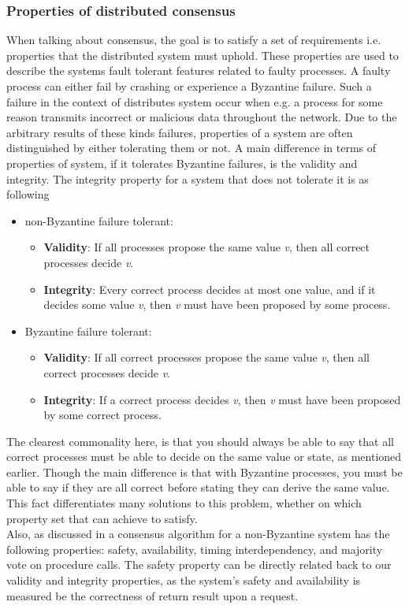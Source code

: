 \subsubsection{Properties of distributed consensus}
When talking about consensus, the goal is to satisfy a set of requirements i.e. properties that the distributed system must uphold. These properties are used to describe the systems fault tolerant features related to faulty processes. A faulty process can either fail by crashing or experience a Byzantine failure. Such a failure in the context of distributes system occur when e.g. a process for some reason transmits incorrect or malicious data throughout the network. Due to the arbitrary results of these kinds failures, properties of a system are often distinguished by either tolerating them or not. A main difference in terms of properties of system, if it tolerates Byzantine failures, is the validity and integrity. The integrity property for a system that does not tolerate it is as following\cite{Distributed Systems}
\begin{itemize}
\item non-Byzantine failure tolerant:
	\begin{itemize}
	\item \textbf{Validity}: If all processes propose the same value \textit{v}, then all correct processes decide \textit{v}.
	\item \textbf{Integrity}: Every correct process decides at most one value, and if it decides some value \textit{v}, then \textit{v} must have been proposed by some process.
	\end{itemize}
\item Byzantine failure tolerant:
	\begin{itemize}
	\item \textbf{Validity}: If all correct processes propose the same value \textit{v}, then all correct processes decide \textit{v}.
	\item \textbf{Integrity}: If a correct process decides \textit{v}, then \textit{v} must have been proposed by some correct process.
	\end{itemize}
\end{itemize}
The clearest commonality here, is that you should always be able to say that all correct processes must be able to decide on the same value or state, as mentioned earlier. Though the main difference is that with Byzantine processes, you must be able to say if they are all correct before stating they can derive the same value. This fact differentiates many solutions to this problem, whether on which property set that can achieve to satisfy. \\
Also, as discussed in \cite{Raft} a consensus algorithm for a non-Byzantine system has the following properties: safety, availability, timing interdependency, and majority vote on procedure calls. The safety property can be directly related back to our validity and integrity properties, as the system's safety and availability is measured be the correctness of return result upon a request.
